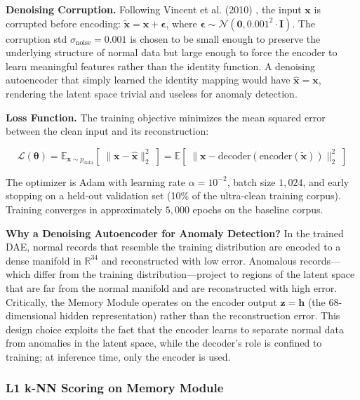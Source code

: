 \textbf{Denoising Corruption.} Following Vincent et al. (2010) \citep{vincent2010stacked}, the input $\mathbf{x}$ is corrupted before encoding: $\tilde{\mathbf{x}} = \mathbf{x} + \boldsymbol{\epsilon}$, where $\boldsymbol{\epsilon} \sim \mathcal{N}(\mathbf{0}, 0.001^2 \cdot \mathbf{I})$. The corruption std $\sigma_{\text{noise}} = 0.001$ is chosen to be small enough to preserve the underlying structure of normal data but large enough to force the encoder to learn meaningful features rather than the identity function. A denoising autoencoder that simply learned the identity mapping would have $\hat{\mathbf{x}} = \mathbf{x}$, rendering the latent space trivial and useless for anomaly detection.

\textbf{Loss Function.} The training objective minimizes the mean squared error between the clean input and its reconstruction:

\begin{equation}
\mathcal{L}(\boldsymbol{\theta}) = \mathbb{E}_{\mathbf{x} \sim p_{\text{data}}}\!\left[\;\|\mathbf{x} - \hat{\mathbf{x}}\|_2^2\;\right]
= \mathbb{E}\!\left[\;\|\mathbf{x} - \text{decoder}(\text{encoder}(\tilde{\mathbf{x}}))\|_2^2\;\right]
\label{eq:dae_loss}
\end{equation}

The optimizer is Adam with learning rate $\alpha=10^{-2}$, batch size $1{,}024$, and early stopping on a held-out validation set (10\% of the ultra-clean training corpus). Training converges in approximately $5{,}000$ epochs on the baseline corpus.

\textbf{Why a Denoising Autoencoder for Anomaly Detection?} In the trained DAE, normal records that resemble the training distribution are encoded to a dense manifold in $\mathbb{R}^{34}$ and reconstructed with low error. Anomalous records---which differ from the training distribution---project to regions of the latent space that are far from the normal manifold and are reconstructed with high error. Critically, the Memory Module operates on the encoder output $\mathbf{z} = \mathbf{h}$ (the $68$-dimensional hidden representation) rather than the reconstruction error. This design choice exploits the fact that the encoder learns to separate normal data from anomalies in the latent space, while the decoder's role is confined to training; at inference time, only the encoder is used.

\subsubsection{L1 k-NN Scoring on Memory Module}

